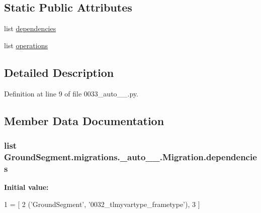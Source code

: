\subsection*{Static Public Attributes}
\begin{DoxyCompactItemize}
\item 
list \hyperlink{class_ground_segment_1_1migrations_1_10033__auto__20170130__1316_1_1_migration_a65ce47b738c17288eb0ec81980026e92}{dependencies}
\item 
list \hyperlink{class_ground_segment_1_1migrations_1_10033__auto__20170130__1316_1_1_migration_a1f99d9fbbb3d0ee996a917fe1630c57e}{operations}
\end{DoxyCompactItemize}


\subsection{Detailed Description}


Definition at line 9 of file 0033\+\_\+auto\+\_\+\_.\+py.



\subsection{Member Data Documentation}
\hypertarget{class_ground_segment_1_1migrations_1_10033__auto__20170130__1316_1_1_migration_a65ce47b738c17288eb0ec81980026e92}{}
\subsubsection[{dependencies}]{\setlength{\rightskip}{0pt plus 5cm}list Ground\+Segment.\+migrations.\+\_\+auto\+\_\+\_.\+Migration.\+dependencies\hspace{0.3cm}{\ttfamily [static]}}\label{class_ground_segment_1_1migrations_1_10033__auto__20170130__1316_1_1_migration_a65ce47b738c17288eb0ec81980026e92}
{\bfseries Initial value\+:}
\begin{DoxyCode}
1 = [
2         (\textcolor{stringliteral}{'GroundSegment'}, \textcolor{stringliteral}{'0032\_tlmyvartype\_frametype'}),
3     ]
\end{DoxyCode}


